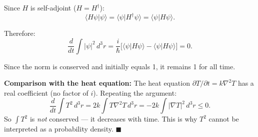 \documentclass[12pt]{article}
\begin{document}
Since $H$ is self-adjoint ($H = H^\dagger$):
\[
\langle H\psi|\psi\rangle = \langle\psi|H^\dagger\psi\rangle = \langle\psi|H\psi\rangle.
\]

Therefore:
\[
\frac{d}{dt}\int|\psi|^2\,d^3r = \frac{i}{\hbar}\bigl[\langle\psi|H\psi\rangle - \langle\psi|H\psi\rangle\bigr] = 0.
\]

Since the norm is conserved and initially equals 1, it remains 1 for all time.

\textbf{Comparison with the heat equation:} The heat equation $\partial T/\partial t = k\nabla^2 T$ has a real coefficient (no factor of $i$). Repeating the argument:
\[
\frac{d}{dt}\int T^2\,d^3r = 2k\int T\nabla^2 T\,d^3r = -2k\int|\nabla T|^2\,d^3r \le 0.
\]
So $\int T^2$ is \textit{not} conserved --- it decreases with time. This is why $T^2$ cannot be interpreted as a probability density. $\blacksquare$
\end{document}
